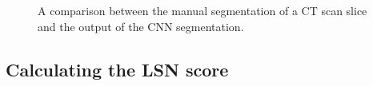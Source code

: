 \documentclass[12pt]{article}
\begin{document}
\begin{figure}[h!!]
  \centering
  \hspace{1em}
  \caption{A comparison between the manual segmentation of a CT scan slice and the output of the CNN segmentation.}
  \label{fig:Segmentations}
\end{figure}

\subsection{Calculating the LSN score}
\end{document}
